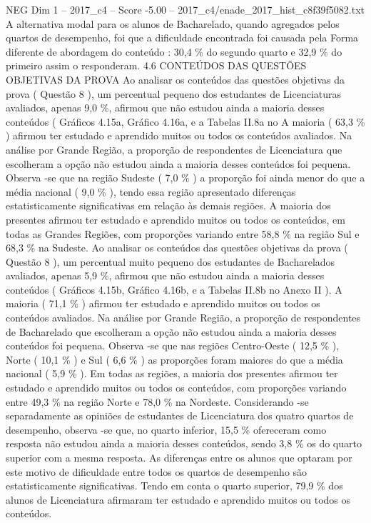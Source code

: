 \begin{textsample}{NEG Dim 1 – 2017\_c4 – Score -5.00 – 2017\_c4/enade\_2017\_hist\_c8f39f5082.txt}
A alternativa modal para os alunos de Bacharelado, quando agregados pelos quartos de desempenho, foi que a dificuldade encontrada foi causada pela Forma diferente de abordagem do conteúdo : 30,4 \% do segundo quarto e 32,9 \% do primeiro assim o responderam. 4.6 CONTEÚDOS DAS QUESTÕES OBJETIVAS DA PROVA Ao analisar os conteúdos das questões objetivas da prova ( Questão 8 ), um percentual pequeno dos estudantes de Licenciaturas avaliados, apenas 9,0 \%, afirmou que não estudou ainda a maioria desses conteúdos ( Gráficos 4.15a, Gráfico 4.16a, e a Tabelas II.8a no A maioria ( 63,3 \% ) afirmou ter estudado e aprendido muitos ou todos os conteúdos avaliados.
Na análise por Grande Região, a proporção de respondentes de Licenciatura que escolheram a opção não estudou ainda a maioria desses conteúdos foi pequena.
Observa -se que na região Sudeste ( 7,0 \% ) a proporção foi ainda menor do que a média nacional ( 9,0 \% ), tendo essa região apresentado diferenças estatisticamente significativas em relação às demais regiões.
A maioria dos presentes afirmou ter estudado e aprendido muitos ou todos os conteúdos, em todas as Grandes Regiões, com proporções variando entre 58,8 \% na região Sul e 68,3 \% na Sudeste.
Ao analisar os conteúdos das questões objetivas da prova ( Questão 8 ), um percentual muito pequeno dos estudantes de Bacharelados avaliados, apenas 5,9 \%, afirmou que não estudou ainda a maioria desses conteúdos ( Gráficos 4.15b, Gráfico 4.16b, e a Tabelas II.8b no Anexo II ).
A maioria ( 71,1 \% ) afirmou ter estudado e aprendido muitos ou todos os conteúdos avaliados.
Na análise por Grande Região, a proporção de respondentes de Bacharelado que escolheram a opção não estudou ainda a maioria desses conteúdos foi pequena.
Observa -se que nas regiões Centro-Oeste ( 12,5 \% ), Norte ( 10,1 \% ) e Sul ( 6,6 \% ) as proporções foram maiores do que a média nacional ( 5,9 \% ).
Em todas as regiões, a maioria dos presentes afirmou ter estudado e aprendido muitos ou todos os conteúdos, com proporções variando entre 49,3 \% na região Norte e 78,0 \% na Nordeste.
Considerando -se separadamente as opiniões de estudantes de Licenciatura dos quatro quartos de desempenho, observa -se que, no quarto inferior, 15,5 \% ofereceram como resposta não estudou ainda a maioria desses conteúdos, sendo 3,8 \% os do quarto superior com a mesma resposta.
As diferenças entre os alunos que optaram por este motivo de dificuldade entre todos os quartos de desempenho são estatisticamente significativas.
Tendo em conta o quarto superior, 79,9 \% dos alunos de Licenciatura afirmaram ter estudado e aprendido muitos ou todos os conteúdos.

\end{textsample}
